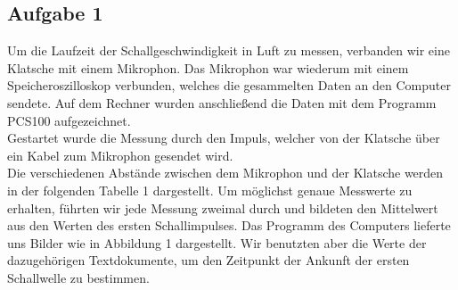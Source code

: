 \subsection{Aufgabe 1}
Um die Laufzeit der Schallgeschwindigkeit in Luft zu messen, verbanden wir eine Klatsche mit einem Mikrophon. Das Mikrophon war wiederum mit einem Speicheroszilloskop verbunden, welches die gesammelten Daten an den Computer sendete. Auf dem Rechner wurden anschließend die Daten mit dem Programm PCS100 aufgezeichnet.\\
Gestartet wurde die Messung durch den Impuls, welcher von der Klatsche über ein Kabel zum Mikrophon gesendet wird.\\
Die verschiedenen Abstände zwischen dem Mikrophon und der Klatsche werden in der folgenden Tabelle 1 dargestellt. Um möglichst genaue Messwerte zu erhalten, führten wir jede Messung zweimal durch und bildeten den Mittelwert aus den Werten des ersten Schallimpulses. Das Programm des Computers lieferte uns Bilder wie in Abbildung 1 dargestellt. Wir benutzten aber die Werte der dazugehörigen Textdokumente, um den Zeitpunkt der Ankunft der ersten Schallwelle zu bestimmen.
\\
\begin{center}
\begin{minipage}{\linewidth}
\centering
{}
\end{minipage}
\label{test}
\end{center}

\begin{center}

\end{center}

